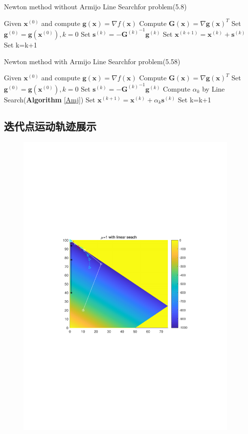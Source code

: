 \begin{algorithm}[h]  
\caption{Newton method without Armijo Line Searchfor problem(5.8)}  
\begin{algorithmic}[1]  
\STATE Given $\bm{x}^{(0)}$ and compute $\bm{g}(\bm{x})= \nabla f(\bm{x})$
\STATE Compute $\bm{G}(\bm{x})= \nabla {\bm{g}(\bm{x})}^T$
\STATE Set $\bm{g}^{(0)}=\bm{g}(\bm{x}^{(0)}),k=0$
\STATE Set $\bm{s}^{(k)}=-{\bm{G}^{(k)}}^{-1}\bm{g}^{(k)}$
\STATE Set $\bm{x}^{(k+1)}=\bm{x}^{(k)}+\bm{s}^{(k)}$
\STATE Set k=k+1
\ENDWHILE
\end{algorithmic}  
\end{algorithm} 

\begin{algorithm}[h]  
\caption{Newton method with Armijo Line Searchfor problem(5.58)}  
\label{NewtonAmj} 
\begin{algorithmic}[1]  
\STATE Given $\bm{x}^{(0)}$ and compute $\bm{g}(\bm{x})= \nabla f(\bm{x})$
\STATE Compute $\bm{G}(\bm{x})= \nabla {\bm{g}(\bm{x})}^T$
\STATE Set $\bm{g}^{(0)}=\bm{g}(\bm{x}^{(0)}),k=0$
\STATE Set $\bm{s}^{(k)}=-{\bm{G}^{(k)}}^{-1}\bm{g}^{(k)}$
\STATE Compute $\alpha_k$ by Line Search(\textbf{Algorithm} \ref{Amj})
\STATE Set $\bm{x}^{(k+1)}=\bm{x}^{(k)}+\alpha_k\bm{s}^{(k)}$
\STATE Set k=k+1
\ENDWHILE
\end{algorithmic}  
\end{algorithm} 



\subsection{迭代点运动轨迹展示}
\begin{figure}[H]
\centering
\includegraphics[width=11cm]{fig/5_1.pdf}
\end{figure}

